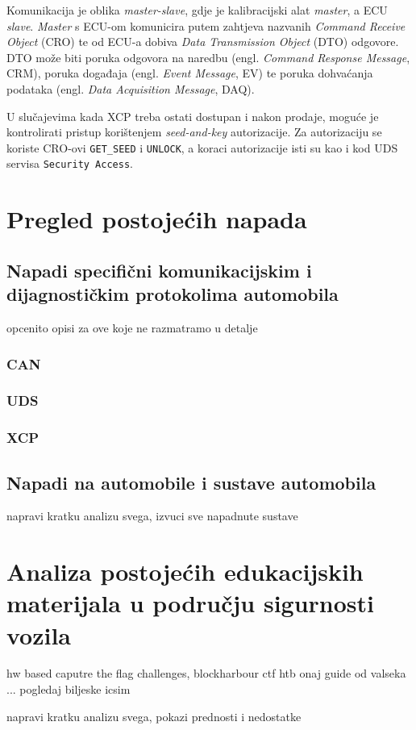 \documentclass[times, utf8, diplomski, numeric]{fer}
\begin{document}
Komunikacija je oblika \textit{master-slave}, gdje je kalibracijski alat \textit{master}, a ECU \textit{slave}. \textit{Master} s ECU-om komunicira putem zahtjeva nazvanih \textit{Command Receive Object} (CRO) te od ECU-a dobiva \textit{Data Transmission Object} (DTO) odgovore. DTO može biti poruka odgovora na naredbu (engl. \textit{Command Response Message}, CRM), poruka događaja (engl. \textit{Event Message}, EV) te poruka dohvaćanja podataka (engl. \textit{Data Acquisition Message}, DAQ).

U slučajevima kada XCP treba ostati dostupan i nakon prodaje, moguće je kontrolirati pristup korištenjem \textit{seed-and-key} autorizacije. Za autorizaciju se koriste CRO-ovi \texttt{GET\_SEED} i \texttt{UNLOCK}, a koraci autorizacije isti su kao i kod UDS servisa \texttt{Security Access}.
\chapter{Pregled postojećih napada}
\section{Napadi specifični komunikacijskim i dijagnostičkim protokolima automobila}
opcenito opisi za ove koje ne razmatramo u detalje
\subsection{CAN}
\subsection{UDS}
\subsection{XCP}
\section{Napadi na automobile i sustave automobila}
napravi kratku analizu svega, izvuci sve napadnute sustave 
\chapter{Analiza postojećih edukacijskih materijala u području sigurnosti vozila}
hw based caputre the flag challenges,
blockharbour ctf
htb
onaj guide od valseka
... pogledaj biljeske
icsim

napravi kratku analizu svega, pokazi prednosti i nedostatke
\end{document}
